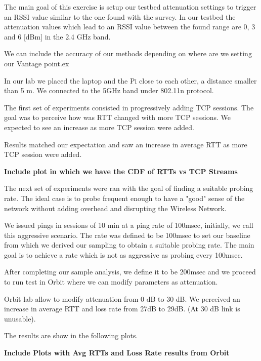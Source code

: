 The main goal of this exercise is setup our testbed attenuation settings to trigger an RSSI value similar to the one found with the survey. In our testbed the attenuation values which lead to an RSSI value between the found range are 0, 3 and 6 [dBm] in the 2.4 GHz band.


We can include the accuracy of our methods depending on where are we setting our Vantage point.ex

In our lab we placed the laptop and the Pi close to each other, a distance smaller than 5 m. We connected to the 5GHz band under 802.11n protocol.

The first set of experiments consisted in progressively adding TCP sessions. The goal was to perceive how was RTT changed with more TCP sessions. We expected to see an increase as more TCP session were added.

Results matched our expectation and saw an increase in average RTT as more TCP session were added.

\textbf{Include plot in which we have the CDF of RTTs vs TCP Streams}

The next set of experiments were ran with the goal of finding a suitable probing rate. The ideal case is to probe frequent enough to have a "good" sense of the network without adding overhead and disrupting the Wireless Network.

We issued pings in sessions of 10 min at a ping rate of 100msec, initially, we call this aggressive scenario. The rate was defined to be 100msec to set our baseline from which we derived our sampling to obtain a suitable probing rate. The main goal is to achieve a rate which is not as aggressive as probing every 100msec.

After completing our sample analysis, we define it to be 200msec and we proceed to run test in Orbit where we can modify parameters as attenuation.

Orbit lab allow to modify attenuation from 0 dB to 30 dB. We perceived an increase in average RTT and loss rate from 27dB to 29dB. (At 30 dB link is unusable).

The results are show in the following plots.

\textbf{Include Plots with Avg RTTs and Loss Rate results from Orbit}




